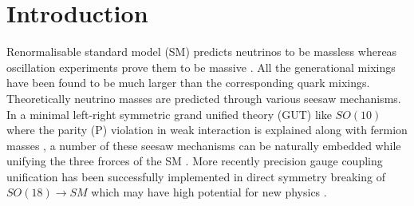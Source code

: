 \documentclass[a4paper,11pt]{article}
\begin{document}
\section{Introduction}\label{sec:intr}
Renormalisable  standard model (SM) predicts  neutrinos to be massless 
 whereas  oscillation experiments prove them
to be massive \cite{Salas:2017,schwetz,forero,fogli,gonzalez}. All the generational mixings have been found to be much larger than the corresponding quark mixings.
Theoretically \cite{Alta:2014,AYS:2014,RNM:2015,RNM:2016,Valle:2016,Valle:2017,gs:2011,nurev:mkpbpn}
 neutrino masses are predicted through
various seesaw
mechanisms\cite{Minkowski:1977,Yanagida:1979,Gell-Mann:1979,Glashow:1979,RNM-gs:1980,Valle:1980,Valle:t2,Magg:t2,Lazaridis:t2,RNM-gs:t2,RNM-mkp:t2,inv1,inv2,inv3,inv4,inv5,inv6,inv7,LG:2000,type-III,Akhmedov,mkp:hybrid,Linear,Rad,mkprad:2011,mkprad:2012}.
 In a minimal left-right
symmetric \cite{JCP:1974,rnmpati:1975,gs-RNM:1975} grand unified theory (GUT)
like $SO(10)$ \cite{georgi:1974} where the
 parity (P) violation in weak interaction is explained along with
 fermion masses
 \cite{babu-rnm:1993,Joshipura,Altarelli-Blankenburg,Bertollini,Goh-Mohapatra}, a number
of these seesaw mechanisms can be naturally embedded while unifying
 the  three frorces of the SM \cite{mkp-PLB:1983}. More recently
 precision gauge coupling unification has been successfully implemented in
 direct symmetry breaking of $SO(18) \to SM$ which may have high
 potential for new physics \cite{Wilczek-Valle}.
\end{document}
